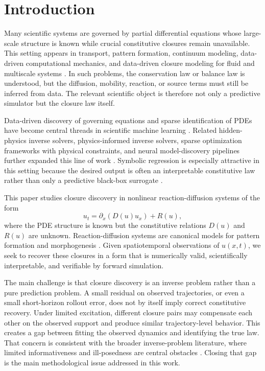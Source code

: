 \documentclass[preprint,12pt]{elsarticle}
\begin{document}
\section{Introduction}

Many scientific systems are governed by partial differential equations whose large-scale structure is known while crucial constitutive closures remain unavailable. This setting appears in transport, pattern formation, continuum modeling, data-driven computational mechanics, and data-driven closure modeling for fluid and multiscale systems \cite{Kirchdoerfer_2016,Kirchdoerfer_2017,Duraisamy_2019,Brunton_2020}. In such problems, the conservation law or balance law is understood, but the diffusion, mobility, reaction, or source terms must still be inferred from data. The relevant scientific object is therefore not only a predictive simulator but the closure law itself.

Data-driven discovery of governing equations and sparse identification of PDEs have become central threads in scientific machine learning \cite{Bongard_2007,Schmidt_2009,Brunton_2016,Rudy_2017,Schaeffer_2017,Reinbold_2020}. Related hidden-physics inverse solvers, physics-informed inverse solvers, sparse optimization frameworks with physical constraints, and neural model-discovery pipelines further expanded this line of work \cite{Raissi_2018,Raissi_2019,Kaheman_2020,Champion_2020,Long_2019,Both_2021,Karniadakis_2021}. Symbolic regression is especially attractive in this setting because the desired output is often an interpretable constitutive law rather than only a predictive black-box surrogate \cite{Udrescu_2020,Cranmer_2020,Biggio_2021,Petersen_2021,LaCava_2021}.

This paper studies closure discovery in nonlinear reaction-diffusion systems of the form
\begin{equation}
u_t = \partial_x \left( D(u) u_x \right) + R(u),
\label{eq:rd_main}
\end{equation}
where the PDE structure is known but the constitutive relations $D(u)$ and $R(u)$ are unknown. Reaction-diffusion systems are canonical models for pattern formation and morphogenesis \cite{Turing_1952,Murray_1989,Kondo_2010}. Given spatiotemporal observations of $u(x,t)$, we seek to recover these closures in a form that is numerically valid, scientifically interpretable, and verifiable by forward simulation.

The main challenge is that closure discovery is an inverse problem rather than a pure prediction problem. A small residual on observed trajectories, or even a small short-horizon rollout error, does not by itself imply correct constitutive recovery. Under limited excitation, different closure pairs may compensate each other on the observed support and produce similar trajectory-level behavior. This creates a gap between fitting the observed dynamics and identifying the true law. That concern is consistent with the broader inverse-problem literature, where limited informativeness and ill-posedness are central obstacles \cite{Tarantola_2005,Isakov_2006,Stuart_2010}. Closing that gap is the main methodological issue addressed in this work.
\end{document}
